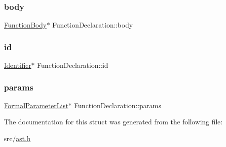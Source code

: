 \subsubsection{\texorpdfstring{body}{body}}
{\footnotesize\ttfamily \hyperlink{struct_function_body}{Function\+Body}$\ast$ Function\+Declaration\+::body}

\mbox{\label{struct_function_declaration_a58de81497de15b01a5f92632c3e6f354}} 
\subsubsection{\texorpdfstring{id}{id}}
{\footnotesize\ttfamily \hyperlink{struct_identifier}{Identifier}$\ast$ Function\+Declaration\+::id}

\mbox{\label{struct_function_declaration_ab22f1972d3575c2b95778545d871658b}} 
\subsubsection{\texorpdfstring{params}{params}}
{\footnotesize\ttfamily \hyperlink{struct_formal_parameter_list}{Formal\+Parameter\+List}$\ast$ Function\+Declaration\+::params}



The documentation for this struct was generated from the following file\+:\begin{DoxyCompactItemize}
\item 
src/\hyperlink{ast_8h}{ast.\+h}\end{DoxyCompactItemize}
